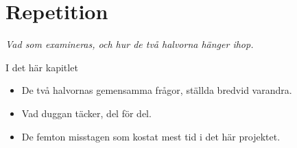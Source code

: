 \chapter{Repetition}
\label{ch:repetition}


{\large\itshape Vad som examineras, och hur de två halvorna hänger ihop.\par}

\begin{chapterbox}{I det här kapitlet}
\begin{itemize}
  \item De två halvornas gemensamma frågor, ställda bredvid varandra.
  \item Vad duggan täcker, del för del.
  \item De femton misstagen som kostat mest tid i det här projektet.
\end{itemize}
\end{chapterbox}



